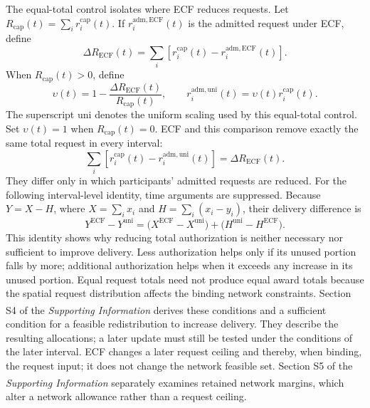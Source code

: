 \documentclass[twoside,twocolumn,9pt]{article}
\newcommand{\suppref}{\textit{Supporting Information}\textsuperscript{\dag}}
\begin{document}
{The equal-total control isolates where ECF reduces requests. Let
$R_{\mathrm{cap}}(t)=\sum_i r_i^{\mathrm{cap}}(t)$. If
$r_i^{\mathrm{adm,ECF}}(t)$ is the admitted request under ECF, define
\begin{equation}
\Delta R_{\mathrm{ECF}}(t)=\sum_i\left[
r_i^{\mathrm{cap}}(t)-r_i^{\mathrm{adm,ECF}}(t)\right].
\label{eq:ecf_total_request_reduction}
\end{equation}
When
$R_{\mathrm{cap}}(t)>0$, define
\begin{equation}
\upsilon(t)=1-\frac{\Delta R_{\mathrm{ECF}}(t)}{R_{\mathrm{cap}}(t)},
\qquad
r_i^{\mathrm{adm,uni}}(t)=\upsilon(t)r_i^{\mathrm{cap}}(t).
\label{eq:equal_total_control}
\end{equation}
The superscript $\mathrm{uni}$ denotes the uniform scaling used by this
equal-total control.
Set $\upsilon(t)=1$ when $R_{\mathrm{cap}}(t)=0$. ECF and this comparison remove
exactly the same total request in every interval:
\begin{equation}
\sum_i\left[r_i^{\mathrm{cap}}(t)-r_i^{\mathrm{adm,uni}}(t)\right]
=\Delta R_{\mathrm{ECF}}(t).
\label{eq:equal_request_reduction_identity}
\end{equation}
They differ only in which participants' admitted requests are reduced. For the
following interval-level identity, time arguments are suppressed. Because
$Y=X-H$, where
$X=\sum_i x_i$ and $H=\sum_i(x_i-y_i)$, their delivery difference is
\begin{equation}
Y^{\mathrm{ECF}}-Y^{\mathrm{uni}}
=\bigl(X^{\mathrm{ECF}}-X^{\mathrm{uni}}\bigr)
+\bigl(H^{\mathrm{uni}}-H^{\mathrm{ECF}}\bigr).
\label{eq:delivery_advantage_decomposition}
\end{equation}
This identity shows why reducing total authorization is neither necessary nor
sufficient to improve delivery. Less authorization helps only if its unused
portion falls by more; additional authorization helps when it exceeds any
increase in its unused portion. Equal request totals need not produce equal
award totals because the spatial request distribution affects the binding
network constraints. Section S4 of the \suppref{} derives these conditions and
a sufficient condition for a feasible redistribution to increase delivery.
They describe the resulting allocations; a later update must still be tested
under the conditions of the later interval.
ECF changes a later request
ceiling and thereby, when binding, the request input; it does not change the
network feasible set. Section S5 of the \suppref{} separately examines retained
network margins, which alter a network allowance rather than a request ceiling.

}
\end{document}
